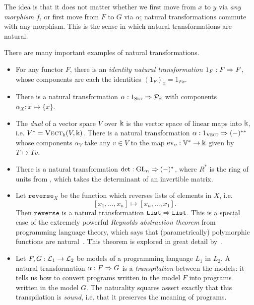 The idea is that it does not matter whether we first move from $x$ to $y$ via
\emph{any morphism} $f$, or first move from $F$ to $G$ via $\alpha$; natural
transformations commute with any morphism. This is the sense in which natural
transformations are natural.

\begin{ex}
  There are many important examples of natural transformations.
  \begin{itemize}
    \item For any functor $F$, there is an \emph{identity natural transformation
      $1_F: F\Rightarrow F$}, whose components are each the identities $(1_F)_x = 1_{Fx}$.
    \item There is a natural transformation $\alpha: 1_{\textsc{\text{Set}}}\Rightarrow
      \mathcal{P}_\exists$ with components $\alpha_X: x\mapsto \{x\}$.
    \item The \emph{dual} of a vector space $V$ over $\Bbbk$ is the vector space
      of linear maps into $\Bbbk$, i.e. $V^* = {\textsc{\text{Vect}}}_\Bbbk(V, \Bbbk)$. There is
      a natural transformation $\alpha: 1_{{\textsc{\text{Vect}}}}\Rightarrow (-)^{**}$ whose
      components $\alpha_V$ take any $v\in V$ to the map $\text{ev}_v:
      \mathbb{V}^*\to\Bbbk$ given by $T\mapsto Tv$.
    \item There is a natural transformation $\det:\text{GL}_n\Rightarrow (-)^*$, where
      $R^*$ is the ring of units from , which
      takes the determinant of an invertible matrix.
    \item Let $\texttt{reverse}_X$ be the function which reverses lists of
      elements in $X$, i.e. \[
        [x_1, \ldots, x_n]\mapsto [x_n, \ldots, x_1].
      \] Then $\texttt{reverse}$ is a natural transformation $\texttt{List}\Rightarrow
      \texttt{List}$. This is a special case of the extremely powerful
      \emph{Reynolds abstraction theorem} from programming language theory,
      which says that (parametrically) polymorphic functions are
      natural~\cite{reynolds-1983}. This theorem is explored in great detail
      by~\cite{wadler-1989}.
    \item Let $F,G:\mathcal{L}_1\to\mathcal{L}_2$ be models of a programming language $L_1$ in
      $L_2$. A natural transformation $\alpha: F\Rightarrow G$ is a \emph{transpilation}
      between the models: it tells us how to convert programs written in the
      model $F$ into programs written in the model $G$. The naturality squares
      assert exactly that this transpilation is \emph{sound}, i.e. that it
      preserves the meaning of programs.
 \end{itemize}
\end{ex}


